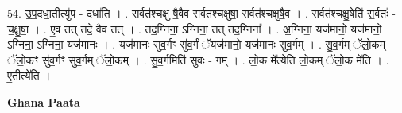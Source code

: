 \documentclass[17pt]{extarticle}
\begin{document}
54. उ॒प॒दधा॒तीत्यु॑प - दधा॑ति । . सर्वत॑श्चक्षु षै॒वैव सर्वत॑श्चक्षुषा॒ सर्वत॑श्चक्षुषै॒व । . सर्वत॑श्चक्षु॒षेति॑ स॒र्वतः॑ - च॒क्षु॒षा॒ । . ए॒व तत् तदे॒ वैव तत् । . तद॒ग्निना॒ ऽग्निना॒ तत् तद॒ग्निना᳚ । . अ॒ग्निना॒ यज॑मानो॒ यज॑मानो॒ ऽग्निना॒ ऽग्निना॒ यज॑मानः । . यज॑मानः सुव॒र्गꣳ सु॑व॒र्गं ॅयज॑मानो॒ यज॑मानः सुव॒र्गम् । . सु॒व॒र्गम् ॅलो॒कम् ॅलो॒कꣳ सु॑व॒र्गꣳ सु॑व॒र्गम् ॅलो॒कम् । . सु॒व॒र्गमिति॑ सुवः - गम् । . लो॒क मे᳚त्येति लो॒कम् ॅलो॒क मे॑ति । . ए॒तीत्ये॑ति । \newline

\textbf{Ghana Paata } \newline
\end{document}
